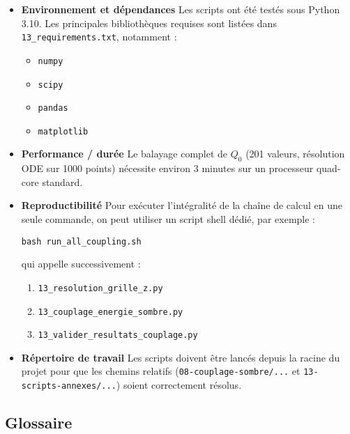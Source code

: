 \begin{itemize}
  \item \textbf{Environnement et dépendances}  
    Les scripts ont été testés sous Python 3.10.  
    Les principales bibliothèques requises sont listées dans \texttt{13\_requirements.txt}, notamment :
    \begin{itemize}
      \item \texttt{numpy}  
      \item \texttt{scipy}  
      \item \texttt{pandas}  
      \item \texttt{matplotlib}  
    \end{itemize}

  \item \textbf{Performance / durée}  
    Le balayage complet de \(Q_{0}\) (201 valeurs, résolution ODE sur 1000 points)  
    nécessite environ 3 minutes sur un processeur quad-core standard.

  \item \textbf{Reproductibilité}  
    Pour exécuter l’intégralité de la chaîne de calcul en une seule commande, on peut utiliser un script shell dédié, par exemple :
    \begin{verbatim}
bash run_all_coupling.sh
    \end{verbatim}
    qui appelle successivement :
    \begin{enumerate}
      \item \texttt{13\_resolution\_grille\_z.py}  
      \item \texttt{13\_couplage\_energie\_sombre.py}  
      \item \texttt{13\_valider\_resultats\_couplage.py}
    \end{enumerate}

  \item \textbf{Répertoire de travail}  
    Les scripts doivent être lancés depuis la racine du projet pour que les chemins relatifs  
    (\texttt{08-couplage-sombre/...} et \texttt{13-scripts-annexes/...}) soient correctement résolus.
\end{itemize}

\subsection*{Glossaire}

